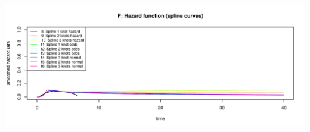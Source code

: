 \documentclass[
]{article}
\begin{document}
\begin{flushleft}\includegraphics[height=0.29\textheight]{Images/validate_extrapolation1-6} \end{flushleft}

\begin{table}


\end{table}
\end{document}
